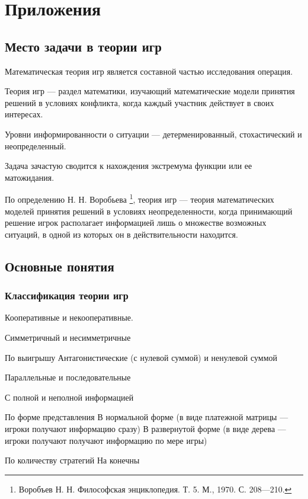 \chapter{Приложения}

\section{Место задачи в теории игр}

Математическая теория игр является составной частью исследования операция. \cite{petrosyan}

Теория игр --- раздел математики, изучающий математические модели принятия решений в условиях конфликта, когда каждый участник действует в своих интересах. \cite[7]{petrosyan}

Уровни информированности о ситуации --- детерменированный, стохастический и неопределенный.

Задача зачастую сводится к нахождения экстремума функции или ее матожидания.

По определению Н. Н. Воробьева \footnote{Воробъев Н. Н. Философская энциклопедия. Т. 5. М., 1970. С. 208—210.}, теория игр --- теория математических моделей принятия решений в условиях неопределенности, когда принимающий решение игрок располагает информацией лишь о множестве возможных ситуаций, в одной из которых он в действительности находится.




\section{Основные понятия}

\subsection*{Классификация теории игр}

Кооперативные и некооперативные.


Симметричный и несимметричные 

По выигрышу
Антагонистические (с нулевой суммой) и ненулевой суммой

Параллельные и последовательные

С полной и неполной информацией


По форме представления
В нормальной форме (в виде платежной матрицы --- игроки получают информацию сразу)
В развернутой форме (в виде дерева --- игроки получают получают информацию по мере игры)

По количеству стратегий
На конечны


